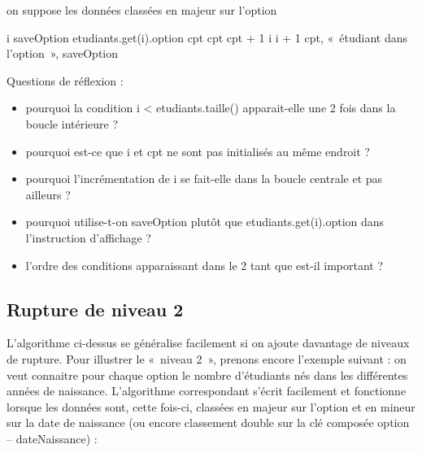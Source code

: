 	\begin{LDA}
		\label{algo:rupt1}
			\LComment on suppose les données classées en majeur sur l’option
	
			\Let i 
				\Let saveOption \Gets etudiants.get(i).option
				\Let cpt 
					\Let cpt \Gets cpt + 1
					\Let i \Gets i + 1
				\EndWhile
				\Write cpt, «~étudiant dans l’option~», saveOption
			\EndWhile
		\EndAlgo
	\end{LDA}

	\medskip
	Questions de réflexion :
	\begin{itemize}
		\item 
			pourquoi la condition \textsf{i < etudiants.taille()}
			apparait-elle une 2\ieme{} fois dans la boucle intérieure ?
		\item 
			pourquoi est-ce que \textsf{i} et \textsf{cpt} 
			ne sont pas initialisés au même endroit ?
		\item 
			pourquoi l'incrémentation de \textsf{i} se fait-elle dans la boucle centrale 
			et pas ailleurs ?
		\item 
			pourquoi utilise-t-on 
			\textsf{saveOption} plutôt que \textsf{etudiants.get(i).option}
			dans l’instruction d’affichage ?
		\item 
			l’ordre des conditions apparaissant dans le 2\ieme{} \og{}tant que\fg{} 
			est-il important ?
	\end{itemize}

\subsection*{Rupture de niveau 2}

	L’algorithme ci-dessus se généralise facilement si on ajoute davantage de niveaux de rupture. 
	Pour illustrer le «~niveau 2~», prenons encore l’exemple suivant : 
	on veut connaitre pour chaque option le nombre d’étudiants nés dans les différentes années de naissance. 
	L’algorithme correspondant s’écrit facilement et fonctionne lorsque les données sont, cette fois-ci,
	classées en majeur sur l'option et en mineur sur la date de naissance
	(ou encore classement double sur la clé composée option – dateNaissance) :
	
